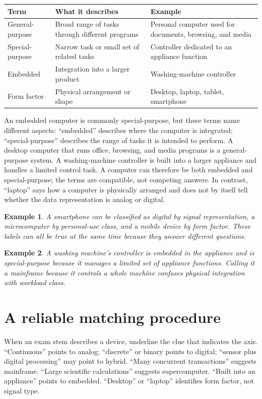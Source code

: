 \documentclass[11pt]{article}
\newtheorem{example}{Example}[section]
\begin{document}
\begin{center}
\begin{tabular}{p{}p{}p{}}
\toprule
\textbf{Term} & \textbf{What it describes} & \textbf{Example}\\
\midrule
General-purpose & Broad range of tasks through different programs & Personal computer used for documents, browsing, and media\\
Special-purpose & Narrow task or small set of related tasks & Controller dedicated to an appliance function\\
Embedded & Integration into a larger product & Washing-machine controller\\
Form factor & Physical arrangement or shape & Desktop, laptop, tablet, smartphone\\
\bottomrule
\end{tabular}
\end{center}

An embedded computer is commonly special-purpose, but these terms name
different aspects: ``embedded'' describes where the computer is integrated;
``special-purpose'' describes the range of tasks it is intended to perform.
A desktop computer that runs office, browsing, and media programs is a
general-purpose system. A washing-machine controller is built into a larger
appliance and handles a limited control task. A computer can therefore be
both embedded and special-purpose; the terms are compatible, not competing
answers. In contrast, ``laptop'' says how a computer is physically arranged
and does not by itself tell whether the data representation is analog or
digital.

\begin{example}
A smartphone can be classified as digital by signal representation, a
microcomputer by personal-use class, and a mobile device by form factor.
These labels can all be true at the same time because they answer different
questions.
\end{example}

\begin{example}
A washing machine's controller is embedded in the appliance and is
special-purpose because it manages a limited set of appliance functions.
Calling it a mainframe because it controls a whole machine confuses physical
integration with workload class.
\end{example}

\section{A reliable matching procedure}
When an exam stem describes a device, underline the clue that indicates the
axis. ``Continuous'' points to analog; ``discrete'' or binary points to
digital; ``sensor plus digital processing'' may point to hybrid. ``Many
concurrent transactions'' suggests mainframe. ``Large scientific
calculations'' suggests supercomputer. ``Built into an appliance'' points to
embedded. ``Desktop'' or ``laptop'' identifies form factor, not signal type.
\end{document}
